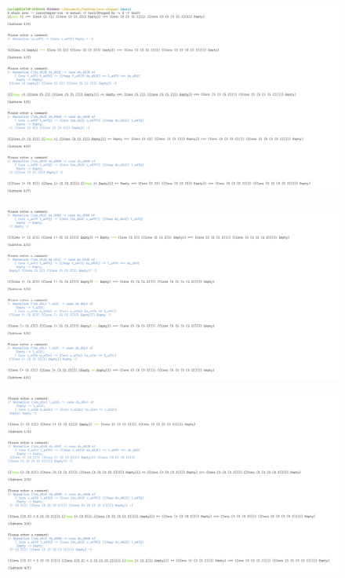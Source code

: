 \begin{figure}
    \includegraphics[width=1\textwidth]{resources/applicative_part_1.PNG}
\end{figure}
\begin{figure}
    \includegraphics[width=1\textwidth]{resources/applicative_part_2.PNG}
\end{figure}
\begin{figure}
    \includegraphics[width=1\textwidth]{resources/applicative_part_3.PNG}
\end{figure}

